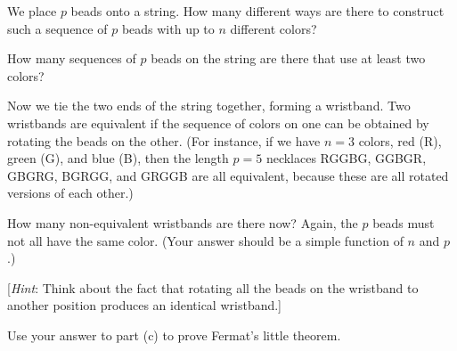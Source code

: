 \documentclass[11pt]{article}
\begin{document}
\begin{Parts}
    \Part
    We place $p$ beads onto a string.
    How many different ways are there to construct such a sequence of $p$ beads with up to $n$ different colors?

    \Part 
    How many sequences of $p$ beads on the string are there that use at least two colors?

    \Part
    Now we tie the two ends of the string together, forming a
    wristband.
    Two wristbands are equivalent if the sequence of colors on one
    can be obtained by rotating the beads on the other.
    (For instance, if we have $n=3$ colors, red (R), green (G), and
    blue (B), then the length $p = 5$ necklaces RGGBG, GGBGR, GBGRG, BGRGG, and GRGGB are all
    equivalent, because these are all rotated versions of each other.)

    How many non-equivalent wristbands are there now?
    Again, the $p$
    beads must not all have the same color.
    (Your answer should be a simple function of $n$ and $p$.)

    [\textit{Hint}: Think about the fact that rotating all the beads on the wristband to another
        position produces an identical wristband.]

    \Part Use your answer to part (c) to prove Fermat's little theorem.
\end{Parts}
\end{document}
